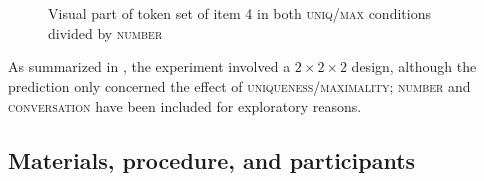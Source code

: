 \documentclass[output=paper]{langscibook}
\begin{document}
\begin{figure}[p]
\hspace{.3cm}
~

\hspace{.3cm}
~
\caption{Visual part of token set of item 4 in both \textsc{uniq/max} conditions divided by \textsc{number}}\label{sim-dem:fig:window}
\end{figure}

As summarized in , the experiment involved a $2\times 2\times 2$ design, although the prediction only concerned the effect of \textsc{uniqueness/maximality}; \textsc{number} and \textsc{conversation} have been included for exploratory reasons.

\subsection{Materials, procedure, and participants}\label{sim-dem:sec:materials}
\end{document}
